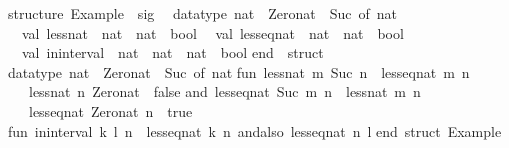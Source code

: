\begin{isabellebody}
%
\isadelimquote
%
\endisadelimquote
%
\isatagquote
%
\begin{isamarkuptext}%
\begin{typewriter}
    structure\ Example\ {\isacharcolon}\ sig\isanewline
\ \ datatype\ nat\ {\isacharequal}\ Zero{\isacharunderscore}nat\ {\isacharbar}\ Suc\ of\ nat\isanewline
\ \ val\ less{\isacharunderscore}nat\ {\isacharcolon}\ nat\ {\isacharminus}{\isachargreater}\ nat\ {\isacharminus}{\isachargreater}\ bool\isanewline
\ \ val\ less{\isacharunderscore}eq{\isacharunderscore}nat\ {\isacharcolon}\ nat\ {\isacharminus}{\isachargreater}\ nat\ {\isacharminus}{\isachargreater}\ bool\isanewline
\ \ val\ in{\isacharunderscore}interval\ {\isacharcolon}\ nat\ {\isacharasterisk}\ nat\ {\isacharminus}{\isachargreater}\ nat\ {\isacharminus}{\isachargreater}\ bool\isanewline
end\ {\isacharequal}\ struct\isanewline
\isanewline
datatype\ nat\ {\isacharequal}\ Zero{\isacharunderscore}nat\ {\isacharbar}\ Suc\ of\ nat{\isacharsemicolon}\isanewline
\isanewline
fun\ less{\isacharunderscore}nat\ m\ {\isacharparenleft}Suc\ n{\isacharparenright}\ {\isacharequal}\ less{\isacharunderscore}eq{\isacharunderscore}nat\ m\ n\isanewline
\ \ {\isacharbar}\ less{\isacharunderscore}nat\ n\ Zero{\isacharunderscore}nat\ {\isacharequal}\ false\isanewline
and\ less{\isacharunderscore}eq{\isacharunderscore}nat\ {\isacharparenleft}Suc\ m{\isacharparenright}\ n\ {\isacharequal}\ less{\isacharunderscore}nat\ m\ n\isanewline
\ \ {\isacharbar}\ less{\isacharunderscore}eq{\isacharunderscore}nat\ Zero{\isacharunderscore}nat\ n\ {\isacharequal}\ true{\isacharsemicolon}\isanewline
\isanewline
fun\ in{\isacharunderscore}interval\ {\isacharparenleft}k{\isacharcomma}\ l{\isacharparenright}\ n\ {\isacharequal}\ {\isacharparenleft}less{\isacharunderscore}eq{\isacharunderscore}nat\ k\ n{\isacharparenright}\ andalso\ {\isacharparenleft}less{\isacharunderscore}eq{\isacharunderscore}nat\ n\ l{\isacharparenright}{\isacharsemicolon}\isanewline
\isanewline
end{\isacharsemicolon}\ {\isacharparenleft}{\isacharasterisk}struct\ Example{\isacharasterisk}{\isacharparenright}\isanewline


\end{typewriter}
\end{isamarkuptext}
\end{isabellebody}
